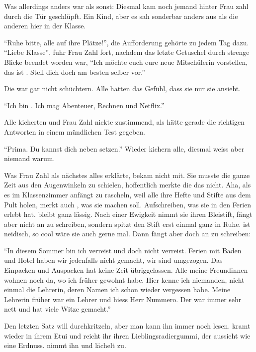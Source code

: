 Was allerdings anders war als sonst: Diesmal kam noch jemand hinter Frau zahl durch die Tür geschlüpft. Ein Kind, aber es sah sonderbar anders aus als die anderen hier in der Klasse.

\enquote{Ruhe bitte, alle auf ihre Plätze!}, die Aufforderung gehörte zu jedem Tag dazu. \enquote{Liebe Klasse}, fuhr Frau Zahl fort, nachdem das letzte Getuschel durch strenge Blicke beendet worden war, \enquote{Ich möchte euch eure neue Mitschülerin vorstellen, das ist . Stell dich doch am besten selber vor.}

Die  war gar nicht schüchtern. Alle hatten das Gefühl, dass sie nur sie ansieht.

\enquote{Ich bin . Ich mag Abenteuer, Rechnen und Netflix.}

Alle kicherten und Frau Zahl nickte zustimmend, als hätte  gerade die richtigen Antworten in einem mündlichen Test gegeben.

\enquote{Prima. Du kannst dich neben  setzen.} Wieder kichern alle, diesmal weiss aber niemand warum.

Was Frau Zahl als nächstes alles erklärte, bekam  nicht mit. Sie musste die ganze Zeit aus den Augenwinkeln zu  schielen, hoffentlich merkte die das nicht. Aha, als es im Klassenzimmer anfängt zu rascheln, weil alle ihre Hefte und Stifte aus dem Pult holen, merkt auch , was sie machen soll. Aufschreiben, was sie in den Ferien erlebt hat.  bleibt ganz lässig. Nach einer Ewigkeit nimmt sie ihren Bleistift, fängt aber nicht an zu schreiben, sondern spitzt den Stift erst einmal ganz in Ruhe.  ist neidisch, so cool wäre sie auch gerne mal. Dann fängt  aber doch an zu schreiben:

\enquote{In diesem Sommer bin ich verreist und doch nicht verreist. Ferien mit Baden und Hotel haben wir jedenfalls nicht gemacht, wir sind umgezogen. Das Einpacken und Auspacken hat keine Zeit übriggelassen. Alle meine Freundinnen wohnen noch da, wo ich früher gewohnt habe. Hier kenne ich niemanden, nicht einmal die Lehrerin, deren Namen ich schon wieder vergessen habe. Meine Lehrerin früher war ein Lehrer und hiess Herr Nummero. Der war immer sehr nett und hat viele Witze gemacht.}

Den letzten Satz will  durchkritzeln, aber man kann ihn immer noch lesen.  kramt wieder in ihrem Etui und reicht ihr ihren Lieblingsradiergummi, der aussieht wie eine Erdnuss.  nimmt ihn und lächelt  zu.

